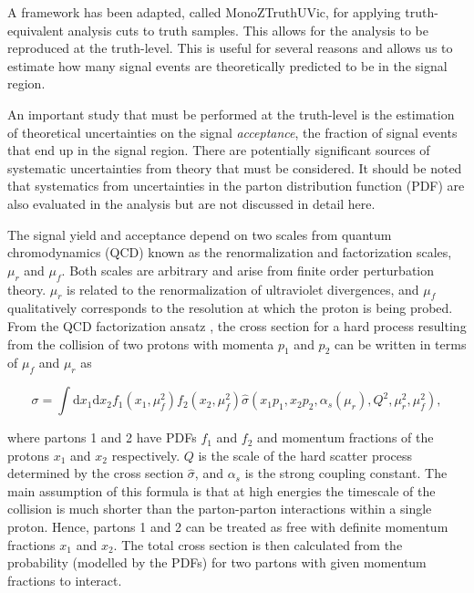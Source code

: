 A framework has been adapted, called MonoZTruthUVic, for applying truth-equivalent analysis cuts to truth samples. This allows for the analysis to be reproduced at the truth-level. This is useful for several reasons and allows us to estimate how many signal events are theoretically predicted to be in the signal region.

An important study that must be performed at the truth-level is the estimation of theoretical uncertainties on the signal \textit{acceptance}, the fraction of signal events that end up in the signal region. There are potentially significant sources of systematic uncertainties from theory that must be considered. It should be noted that systematics from uncertainties in the parton distribution function (PDF) are also evaluated in the analysis but are not discussed in detail here. 

The signal yield and acceptance depend on two scales from quantum chromodynamics (QCD) known as the renormalization and factorization scales, $\mu_r$ and $\mu_f$. Both scales are arbitrary and arise from finite order perturbation theory. $\mu_r$ is related to the renormalization of ultraviolet divergences, and $\mu_f$ qualitatively corresponds to the resolution at which the proton is being probed. From the QCD factorization ansatz \cite{Collins:1989gx}, the cross section for a hard process resulting from the collision of two protons with momenta $p_1$ and $p_2$ can be written in terms of $\mu_f$ and $\mu_r$ as

\begin{equation}
\sigma = \int \text{d}x_1 \text{d}x_2 f_1(x_1, \mu_f^2) f_2 (x_2, \mu_f^2) \hat{\sigma}(x_1 p_1, x_2 p_2, \alpha_s(\mu_r), Q^2, \mu_r^2, \mu_f^2),
\end{equation}

\noindent where partons 1 and 2 have PDFs $f_1$ and $f_2$ and momentum fractions of the protons $x_1$ and $x_2$ respectively. $Q$ is the scale of the hard scatter process determined by the cross section $\hat{\sigma}$, and $\alpha_s$ is the strong coupling constant. The main assumption of this formula is that at high energies the timescale of the collision is much shorter than the parton-parton interactions within a single proton. Hence, partons 1 and 2 can be treated as free with definite momentum fractions $x_1$ and $x_2$. The total cross section is then calculated from the probability (modelled by the PDFs) for two partons with given momentum fractions to interact. 

